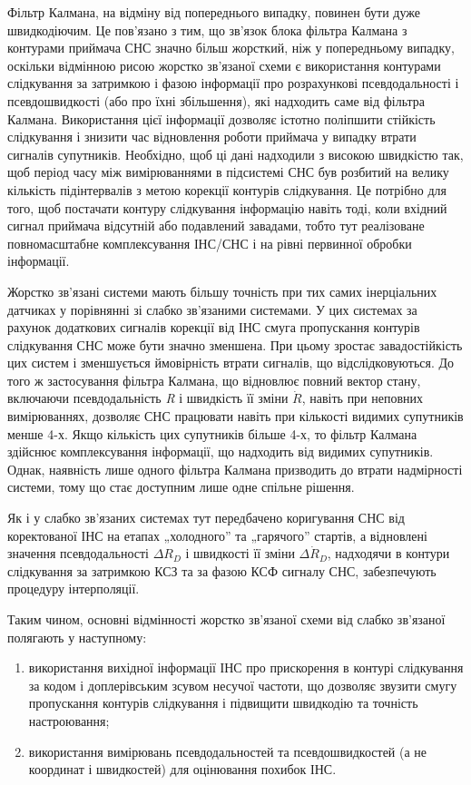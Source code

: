 Фільтр Калмана, на відміну від попереднього випадку, повинен бути дуже швидкодіючим. 
Це пов'язано з тим, що зв'язок блока фільтра Калмана з контурами приймача СНС значно 
більш жорсткий, ніж у попередньому випадку, оскільки відмінною рисою жорстко зв'язаної 
схеми є використання контурами слідкування за затримкою і фазою інформації про розрахункові 
псевдодальності і псевдошвидкості (або про їхні збільшення), які надходить саме від 
фільтра Калмана. Використання цієї інформації дозволяє істотно поліпшити стійкість 
слідкування і знизити час відновлення роботи приймача у випадку втрати сигналів супутників. 
Необхідно, щоб ці дані надходили з високою швидкістю так, щоб період часу між вимірюваннями 
в підсистемі СНС був розбитий на велику кількість підінтервалів  з метою корекції 
контурів слідкування. Це потрібно для того, щоб постачати контуру слідкування інформацію 
навіть тоді, коли вхідний сигнал приймача відсутній або подавлений завадами, тобто 
тут реалізоване повномасштабне комплексування ІНС/СНС і на рівні первинної обробки 
інформації.

Жорстко зв'язані системи мають більшу точність при тих самих інерціальних датчиках 
у порівнянні зі слабко зв'язаними системами. У цих системах за рахунок додаткових 
сигналів корекції від  ІНС смуга пропускання контурів слідкування СНС може бути значно 
зменшена. При цьому зростає завадостійкість цих систем і зменшується ймовірність 
втрати сигналів, що відслідковуються. До того ж застосування фільтра Калмана, що 
відновлює повний вектор стану, включаючи  псевдодальність \textit{R} і швидкість 
її зміни $\dot{R}$, навіть при неповних вимірюваннях, дозволяє СНС працювати навіть 
при кількості видимих супутників менше 4-х. Якщо кількість цих супутників більше 
4-х, то фільтр Калмана здійснює комплексування інформації, що надходить від видимих 
супутників. Однак, наявність лише одного фільтра Калмана призводить до втрати надмірності 
системи, тому що стає доступним лише одне спільне рішення. 

Як і у слабко зв'язаних системах тут передбачено коригування СНС від коректованої 
ІНС на етапах „холодного'' та „гарячого'' стартів, а відновлені значення псевдодальності 
$\Delta R_{D}$ і швидкості її зміни $\Delta \dot{R}_{D} $, надходячи в контури 
слідкування за затримкою КСЗ  та за фазою КСФ сигналу СНС, забезпечують процедуру 
інтерполяції.

Таким чином, основні відмінності жорстко зв'язаної схеми від слабко зв'язаної полягають 
у наступному:

\begin{enumerate}
\item використання вихідної інформації ІНС про прискорення в контурі слідкування 
за кодом і доплерівським зсувом несучої частоти, що дозволяє звузити смугу пропускання 
контурів слідкування і підвищити швидкодію та точність настроювання;
\item використання вимірювань псевдодальностей та псевдошвидкостей (а не координат 
і швидкостей) для оцінювання похибок ІНС.
\end{enumerate}

